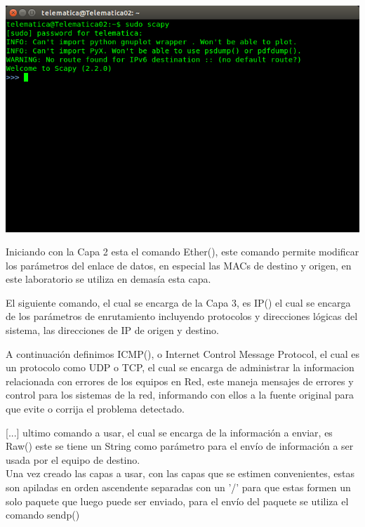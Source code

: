 ﻿\documentclass[spanish]{udpreport}
\begin{document}
\begin{center}
	\includegraphics[scale=.37]{imagenes/Scapy_Init.png}
\end{center}

Iniciando con la Capa 2 esta el comando Ether(), este comando permite modificar los parámetros del enlace de datos, en especial las MACs de destino y origen, en este laboratorio se utiliza en demasía esta capa.


El siguiente comando, el cual se encarga de la Capa 3, es IP() el cual se encarga de los parámetros de enrutamiento incluyendo protocolos y direcciones lógicas del sistema, las direcciones de IP de origen y destino.


A continuación definimos ICMP(), o Internet Control Message Protocol, el cual es un protocolo como UDP o TCP, el cual se encarga de administrar la informacion relacionada con errores de los equipos en Red, este maneja mensajes de errores y control para los sistemas de la red, informando con ellos a la fuente original para que evite o corrija el problema detectado.

[...] ultimo comando a usar, el cual se encarga de la información a enviar, es Raw() este se tiene un String como parámetro para el envío de información a ser usada por el equipo de destino.
\\

Una vez creado las capas a usar, con las capas que se estimen convenientes, estas son apiladas en orden ascendente separadas con un '/' para que estas formen un solo paquete que luego puede ser enviado, para el envío del paquete se utiliza el comando sendp() %
\end{document}
